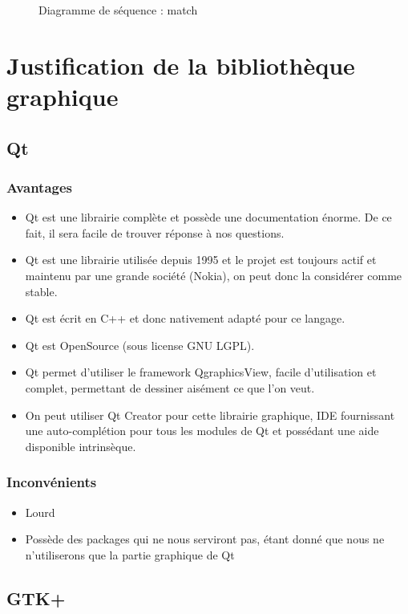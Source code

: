 \documentclass[a4paper]{report}
\begin{document}
\begin{figure}[H]
    \caption{Diagramme de séquence : match}
\end{figure}




\chapter{Justification de la bibliothèque graphique}
\section{Qt}
\subsection{Avantages}
\begin{itemize}
    \item Qt est une librairie complète et possède une documentation énorme. De ce fait, il sera facile de trouver réponse à nos questions.
    \item Qt est une librairie utilisée depuis 1995 et le projet est toujours actif et maintenu par une grande société (Nokia), on peut donc la considérer comme stable.
    \item Qt est écrit en C++ et donc nativement adapté pour ce langage.
    \item Qt est OpenSource (sous license GNU LGPL).
    \item Qt permet d'utiliser le framework QgraphicsView, facile d'utilisation et complet, permettant de dessiner aisément ce que l'on veut.
    \item On peut utiliser Qt Creator pour cette librairie graphique, IDE fournissant une auto-complétion pour tous les modules de Qt et possédant une aide disponible intrinsèque.
\end{itemize}
\subsection{Inconvénients}
\begin{itemize}
    \item Lourd
    \item Possède des packages qui ne nous serviront pas, étant donné que nous ne n'utiliserons que la partie graphique de Qt
\end{itemize}
\section{GTK+}
\end{document}
